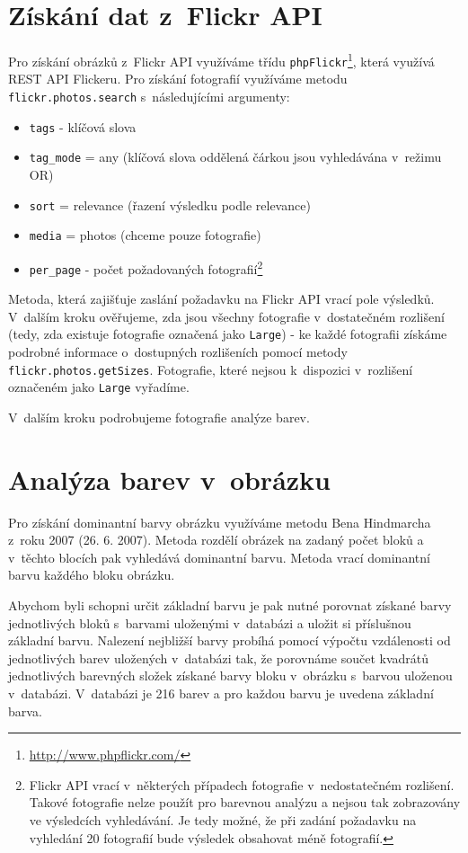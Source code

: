 \documentclass[12pt]{article}
\begin{document}
\section{Získání dat z~Flickr API}
Pro získání obrázků z~Flickr API využíváme třídu \texttt{phpFlickr}\footnote{\url{http://www.phpflickr.com/}}, která využívá REST API Flickeru. Pro získání fotografií využíváme metodu \texttt{flickr.photos.search} s~následujícími argumenty:
\begin{itemize}
\item \texttt{tags} - klíčová slova
\item \texttt{tag\_mode} = any (klíčová slova oddělená čárkou jsou vyhledávána v~režimu OR)
\item \texttt{sort} = relevance (řazení výsledku podle relevance)
\item \texttt{media} = photos (chceme pouze fotografie)
\item \texttt{per\_page} - počet požadovaných fotografií\footnote{Flickr API vrací v~některých případech fotografie v~nedostatečném rozlišení. Takové fotografie nelze použít pro barevnou analýzu a nejsou tak zobrazovány ve výsledcích vyhledávání. Je tedy možné, že při zadání požadavku na vyhledání 20 fotografií bude výsledek obsahovat méně fotografií.}
\end{itemize}

Metoda, která zajišťuje zaslání požadavku na Flickr API vrací pole výsledků. V~dalším kroku ověřujeme, zda jsou všechny fotografie v~dostatečném rozlišení (tedy, zda existuje fotografie označená jako \texttt{Large}) - ke každé fotografii získáme podrobné informace o~dostupných rozlišeních pomocí metody \texttt{flickr.photos.getSizes}. Fotografie, které nejsou k~dispozici v~rozlišení označeném jako \texttt{Large} vyřadíme.

V~dalším kroku podrobujeme fotografie analýze barev.

\section{Analýza barev v~obrázku}
Pro získání dominantní barvy obrázku využíváme metodu Bena Hindmarcha z~roku 2007 (26. 6. 2007). Metoda rozdělí obrázek na zadaný počet bloků a v~těchto blocích pak vyhledává dominantní barvu. Metoda vrací dominantní barvu každého bloku obrázku.

Abychom byli schopni určit základní barvu je pak nutné porovnat získané barvy jednotlivých bloků s~barvami uloženými v~databázi a uložit si příslušnou základní barvu. Nalezení nejbližší barvy probíhá pomocí výpočtu vzdálenosti od jednotlivých barev uložených v~databázi tak, že porovnáme součet kvadrátů jednotlivých barevných složek získané barvy bloku v~obrázku s~barvou uloženou v~databázi. V~databázi je 216 barev a pro každou barvu je uvedena základní barva.
\end{document}
